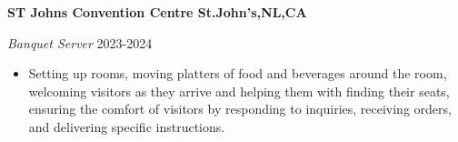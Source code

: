 \textbf{ST Johns Convention Centre \hfill  St.John's,NL,CA} \par
\textit{Banquet Server} \hfill 2023-2024 \par
\begin{itemize}
	\item Setting up rooms, moving platters of food and beverages around the room, welcoming visitors as
they arrive and helping them with finding their seats, ensuring the comfort of visitors by responding
to inquiries, receiving orders, and delivering specific instructions.
\end{itemize} \par